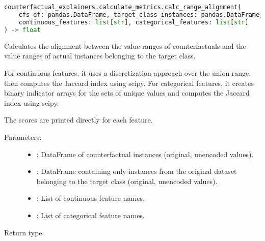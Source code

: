 \subsection{}
\label{func:calc_range_alignment}

\begin{lstlisting}[language=Python, caption={Function Signature}]
counterfactual_explainers.calculate_metrics.calc_range_alignment(
    cfs_df: pandas.DataFrame, target_class_instances: pandas.DataFrame,
    continuous_features: list[str], categorical_features: list[str]
) -> float
\end{lstlisting}

Calculates the alignment between the value ranges of counterfactuals and the value ranges of actual instances belonging to the target class.

For continuous features, it uses a discretization approach over the union range, then computes the Jaccard index using scipy. For categorical features, it creates binary indicator arrays for the sets of unique values and computes the Jaccard index using scipy.

The scores are printed directly for each feature. %

\begin{description}
    \item[Parameters:]
        \begin{itemize}
            \item {}: DataFrame of counterfactual instances (original, unencoded values).
            \item {}: DataFrame containing only instances from the original dataset belonging to the target class (original, unencoded values).
            \item {}: List of continuous feature names.
            \item {}: List of categorical feature names.
        \end{itemize}
     \item[Return type:]  %
\end{description}


\subsection{}
\label{func:calc_size}

